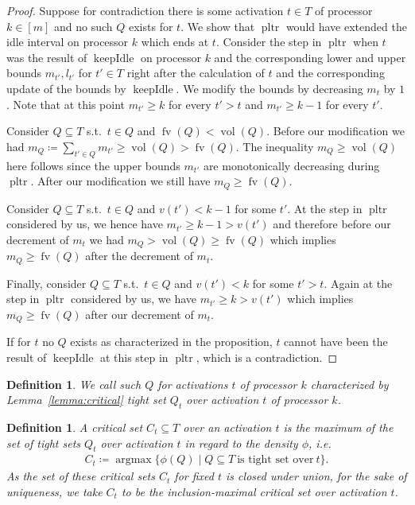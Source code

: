 \documentclass[a4paper]{article}
\DeclareMathOperator{\argmax}{argmax}
\DeclareMathOperator{\pltr}{pltr}
\DeclareMathOperator{\fv}{fv}
\DeclareMathOperator{\vol}{vol}
\DeclareMathOperator{\keepidle}{keepIdle}
\newtheorem{definition}[theorem]{Definition}
\begin{document}
\begin{proof}
  Suppose for contradiction there is some activation $t \in T$ of processor $k \in [m]$ and no such $Q$ exists for $t$.
  We show that $\pltr$ would have extended the idle interval on processor $k$ which ends at $t$.
  Consider the step in $\pltr$ when $t$ was the result of $\keepidle$ on processor $k$ and the corresponding lower and upper bounds $m_{t'}, l_{t'}$ for $t' \in T$ right after the calculation of $t$ and the corresponding update of the bounds by $\keepidle$.
  We modify the bounds by decreasing $m_t$ by $1$.
  Note that at this point $m_{t'} \geq k$ for every $t' > t$ and $m_{t'} \geq k - 1$ for every $t'$.

  Consider $Q \subseteq T$ s.t.\ $t \in Q$ and $\fv(Q) < \vol(Q)$.
  Before our modification we had $m_Q \coloneqq \sum_{t' \in Q} m_{t'} \geq \vol(Q) > \fv(Q)$.
  The inequality $m_Q \geq \vol(Q)$ here follows since the upper bounds $m_{t'}$ are monotonically decreasing during $\pltr$.
  After our modification we still have $m_Q \geq \fv(Q)$.

  Consider $Q \subseteq T$ s.t.\ $t \in Q$ and $v(t') < k - 1$ for some $t'$.
  At the step in $\pltr$ considered by us, we hence have $m_{t'} \geq k - 1 > v(t')$ and therefore before our decrement of $m_t$ we had $m_Q > \vol(Q) \geq \fv(Q)$ which implies $m_Q \geq \fv(Q)$ after the decrement of $m_t$.

  Finally, consider $Q \subseteq T$ s.t.\ $t \in Q$ and $v(t') < k$ for some $t' > t$.
  Again at the step in $\pltr$ considered by us, we have $m_{t'} \geq k > v(t')$ which implies $m_Q \geq \fv(Q)$ after our decrement of $m_t$.

  If for $t$ no $Q$ exists as characterized in the proposition, $t$ cannot have been the result of $\keepidle$ at this step in $\pltr$, which is a contradiction.
\end{proof}

\begin{definition}
  We call such $Q$ for activations $t$ of processor $k$ characterized by Lemma~\ref{lemma:critical} \emph{tight set $Q_t$ over activation $t$ of processor $k$}.
\end{definition}

\begin{definition}
  A \emph{critical set $C_t \subseteq T$ over an activation $t$} is the maximum of the set of tight sets $Q_t$ over activation $t$ in regard to the density $\phi$, i.e.
  \begin{align}
    C_t \coloneqq \argmax \{ \phi(Q) \mid Q \subseteq T~\text{is tight set over}~t \} \text{.}
  \end{align}
  As the set of these critical sets $C_t$ for fixed $t$ is closed under union, for the sake of uniqueness, we take $C_t$ to be the inclusion-maximal critical set over activation $t$.
\end{definition}
\end{document}
